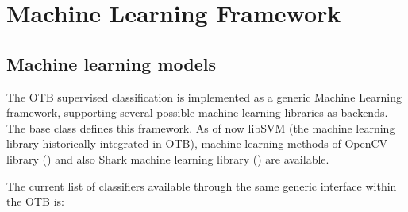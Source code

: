 


\section{Machine Learning Framework}

\subsection{Machine learning models}
\label{sec:MLGenericFramework}

The OTB supervised classification is implemented as a generic Machine Learning
framework, supporting several possible machine learning libraries as backends.
The base class  defines this framework.
As of now libSVM (the machine learning library historically integrated in OTB),
machine learning methods of OpenCV library (\cite{opencv_library}) and also
Shark machine learning library (\cite{shark_library}) are available.

The current list of classifiers available through the same generic interface within the OTB is:


